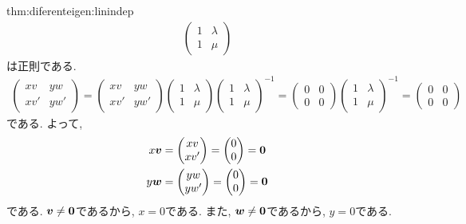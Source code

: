 \begin{proofof}{thm:diferenteigen:linindep}
\begin{align*}
\begin{pmatrix}
      1&\lambda\\1&\mu 
    \end{pmatrix}
  \end{align*}
  は正則である.
  \begin{align*}
    \begin{pmatrix}
      xv&yw\\xv'&yw' 
    \end{pmatrix}=
    \begin{pmatrix}
      xv&yw\\xv'&yw' 
    \end{pmatrix}
    \begin{pmatrix}
      1&\lambda\\1&\mu 
    \end{pmatrix}
    \begin{pmatrix}
      1&\lambda\\1&\mu 
    \end{pmatrix}^{-1}
    =
    \begin{pmatrix}
      0&0\\0&0
    \end{pmatrix}
    \begin{pmatrix}
      1&\lambda\\1&\mu 
    \end{pmatrix}^{-1}
    =
    \begin{pmatrix}
      0&0\\0&0
    \end{pmatrix}
  \end{align*}
  である.
  よって,
  \begin{align*}
    x\boldsymbol{v}&=
    \begin{pmatrix}
      xv\\xv' 
    \end{pmatrix}=
    \begin{pmatrix}
      0\\0
    \end{pmatrix}
    =\boldsymbol{0}\\
    y\boldsymbol{w}&=
    \begin{pmatrix}
      yw\\yw' 
    \end{pmatrix}=
    \begin{pmatrix}
      0\\0
    \end{pmatrix}
    =\boldsymbol{0}
  \end{align*}
  である. $\boldsymbol{v}\neq\boldsymbol{0}$であるから, $x=0$である.
  また, $\boldsymbol{w}\neq\boldsymbol{0}$であるから, $y=0$である.
\end{proofof}
